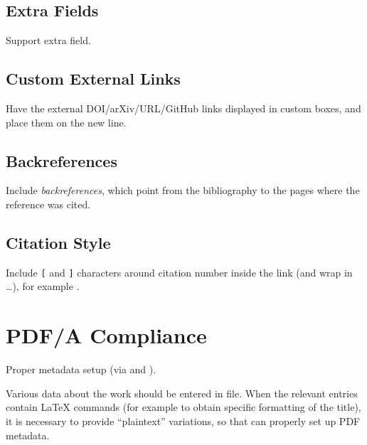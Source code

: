 \subsection{Extra Fields}%
\label{sub:Extra Fields}

Support extra  field.

\subsection{Custom External Links}%
\label{sub:Custom External Links}

Have the external \textsf{DOI/arXiv/URL/GitHub} links displayed in custom boxes, and place them on the new line.

\subsection{Backreferences}%
\label{sub:Backreferences}

Include \emph{backreferences}, which point from the bibliography to the pages where the reference was cited.

\subsection{Citation Style}%
\label{sub:Citation Style}

Include \texttt{[} and \texttt{]} characters around citation number inside the link (and wrap in  \ldots), for example \autocite{TeXtured}.


\section{PDF/A Compliance}%
\label{sec:PDF/A Compliance}

Proper metadata setup (via  and \macro{\DocumentMetadata}).
\begin{remark}
    Various data about the work should be entered in  file.
    When the relevant entries contain \LaTeX{} commands (for example to obtain specific formatting of the title), it is necessary to provide \enquote{plaintext} variations, so that  can properly set up PDF metadata.
\end{remark}

